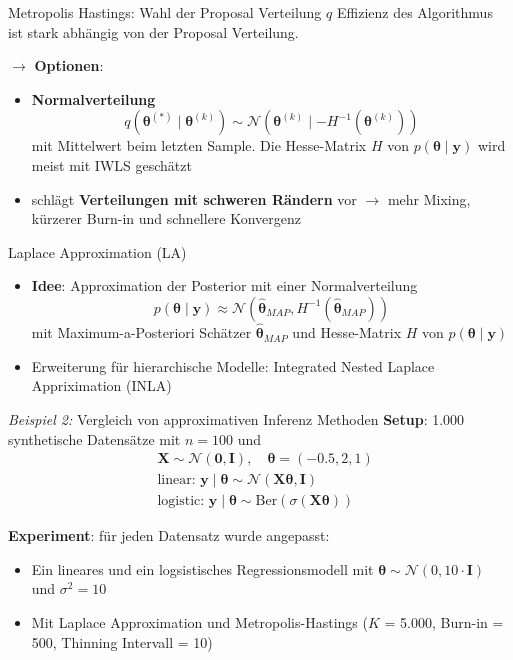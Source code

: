 \documentclass[
  ignorenonframetext,
  aspectratio=169,
]{beamer}
\providecommand{\tightlist}{%
  \setlength{\itemsep}{0pt}\setlength{\parskip}{0pt}}
\newcommand{\bnull}{\bm{0}}
\newcommand{\by}{\bm{y}}
\newcommand{\bI}{\bm{I}}
\newcommand{\bX}{\bm{X}}
\newcommand{\Ncal}{\mathcal{N}}
\newcommand{\ssd}{\sigma^2}
\newcommand{\btheta}{\bm{\theta}}
\newcommand{\hbtheta}{\hat{\bm{\theta}}}
\begin{document}
\begin{frame}{Metropolis Hastings: Wahl der Proposal Verteilung \(q\)}
\protect{}\label{metropolis-hastings-wahl-der-proposal-verteilung-q}
Effizienz des Algorithmus ist stark abhängig von der Proposal
Verteilung.

\(\to\) \textbf{Optionen}:

\begin{itemize}
\item
  \textbf{Normalverteilung} \[
  q(\btheta^{(*)} \mid \btheta^{(k)}) \sim \Ncal(\btheta^{(k)} \mid -H^{-1}(\btheta^{(k)}))
  \] mit Mittelwert beim letzten Sample. Die Hesse-Matrix \(H\) von
  \(p(\btheta \mid \by)\) wird meist mit IWLS geschätzt
  \autocite{gamerman_markov_1998,lenk_bayesian_2000,scott_data_2011}
\item
  \textcite{scott_data_2011} schlägt \textbf{Verteilungen mit schweren
  Rändern} vor \(\to\) mehr Mixing, kürzerer Burn-in und schnellere
  Konvergenz
\end{itemize}
\end{frame}

\begin{frame}{Laplace Approximation (LA)
\autocite{tierney_accurate_1986}}
\protect{}\label{laplace-approximation-la-tierney_accurate_1986}
\begin{itemize}
\tightlist
\item
  \textbf{Idee}: Approximation der Posterior mit einer Normalverteilung
  \[
  p(\btheta \mid \by) \approx \Ncal(\hbtheta_{MAP}, H^{-1}(\hbtheta_{MAP}))
  \] mit Maximum-a-Posteriori Schätzer \(\hbtheta_{MAP}\) und
  Hesse-Matrix \(H\) von \(p(\btheta \mid \by)\)
\item
  Erweiterung für hierarchische Modelle: Integrated Nested Laplace
  Appriximation (INLA) \autocite{rue_approximate_2009}
\end{itemize}
\end{frame}

\begin{frame}{\emph{Beispiel 2:} Vergleich von approximativen Inferenz
Methoden}
\protect{}\label{beispiel-2-vergleich-von-approximativen-inferenz-methoden}
\textbf{Setup}: 1.000 synthetische Datensätze mit \(n=100\) und \[
\begin{aligned}
    &\bX \sim \Ncal(\bnull, \bI), \quad \btheta = (-0.5, 2, 1)\\
    &\text{linear: } \by \mid \btheta \sim \Ncal(\bX \btheta, \bI)\\
    &\text{logistic: } \by \mid \btheta \sim \text{Ber}(\sigma(\bX \btheta))
\end{aligned}
\]

\textbf{Experiment}: für jeden Datensatz wurde angepasst:

\begin{itemize}
\tightlist
\item
  Ein lineares und ein logsistisches Regressionsmodell mit
  \(\btheta \sim \Ncal(0, 10 \cdot \bI)\) und \(\ssd = 10\)
\item
  Mit Laplace Approximation und Metropolis-Hastings (\(K\) = 5.000,
  Burn-in = 500, Thinning Intervall = 10)
\end{itemize}
\end{frame}
\end{document}
